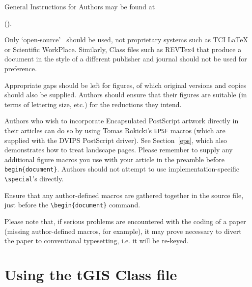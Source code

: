 \documentclass[]{tGIS2e}
\begin{document}
General Instructions for Authors may be found at
\begin{center}().\end{center}

Only `open-source' \LaTeXe\ should be used, not proprietary systems such as TCI LaTeX or Scientific WorkPlace. Similarly, Class files such as REVTex4 that produce a document in the style of a different publisher and journal should not be used for preference.

Appropriate gaps should be left for figures, of which original versions and copies should also be supplied.
Authors should ensure that their figures are suitable (in terms of lettering size, etc.) for the reductions they
intend.

Authors who wish to incorporate Encapsulated PostScript artwork directly in their articles can do so by using
Tomas Rokicki's {\tt EPSF} macros (which are supplied with the DVIPS PostScript driver). See Section~\ref{eps},
which also demonstrates how to treat landscape pages. Please remember to supply any additional figure macros you
use with your article in the preamble before \verb"begin{document}". Authors should not attempt to use
implementation-specific \verb"\special"'s directly.

Ensure that any author-defined macros are gathered together in the source file, just before the
\verb"\begin{document}" command.

Please note that, if serious problems are encountered with the coding of a paper (missing author-defined macros,
for example), it may prove necessary to divert the paper to conventional typesetting, i.e. it will be re-keyed.

\section{Using the {\bi tGIS} Class file}
\end{document}
